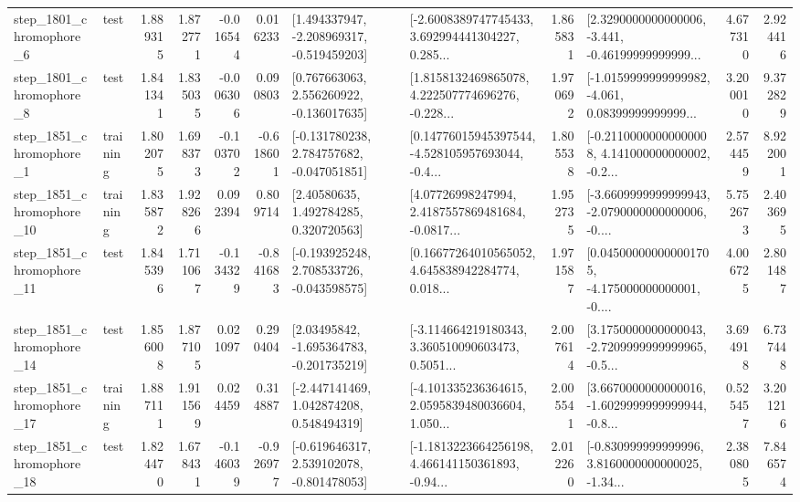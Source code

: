 \begin{tabular}{llrrrrllrlrr}
  step\_1801\_chromophore\_6 &      test &      1.889315 &    1.872771 &     -0.016544 &  0.016233 &   [1.494337947, -2.208969317, -0.519459203] &  [-2.6008389747745433, 3.692994441304227, 0.285... &       1.865831 &  [2.3290000000000006, -3.441, -0.46199999999999... &            4.677310 &          2.924416 \\
  step\_1801\_chromophore\_8 &      test &      1.841341 &    1.835035 &     -0.006306 &  0.090803 &    [0.767663063, 2.556260922, -0.136017635] &  [1.8158132469865078, 4.222507774696276, -0.228... &       1.970692 &  [-1.0159999999999982, -4.061, 0.08399999999999... &            3.200010 &          9.372829 \\
  step\_1851\_chromophore\_1 &  training &      1.802075 &    1.698373 &     -0.103702 & -0.618601 &   [-0.131780238, 2.784757682, -0.047051851] &  [0.14776015945397544, -4.528105957693044, -0.4... &       1.805538 &  [-0.21100000000000008, 4.141000000000002, -0.2... &            2.574459 &          8.922001 \\
 step\_1851\_chromophore\_10 &  training &      1.835872 &    1.928266 &      0.092394 &  0.809714 &      [2.40580635, 1.492784285, 0.320720563] &  [4.07726998247994, 2.4187557869481684, -0.0817... &       1.952735 &  [-3.6609999999999943, -2.0790000000000006, -0.... &            5.752673 &          2.403695 \\
 step\_1851\_chromophore\_11 &      test &      1.845396 &    1.711067 &     -0.134329 & -0.841683 &   [-0.193925248, 2.708533726, -0.043598575] &  [0.16677264010565052, 4.645838942284774, 0.018... &       1.971587 &  [0.045000000000001705, -4.175000000000001, -0.... &            4.006725 &          2.801487 \\
 step\_1851\_chromophore\_14 &      test &      1.856008 &    1.877105 &      0.021097 &  0.290404 &    [2.03495842, -1.695364783, -0.201735219] &  [-3.114664219180343, 3.360510090603473, 0.5051... &       2.007614 &  [3.1750000000000043, -2.7209999999999965, -0.5... &            3.694918 &          6.737448 \\
 step\_1851\_chromophore\_17 &  training &      1.887111 &    1.911569 &      0.024459 &  0.314887 &    [-2.447141469, 1.042874208, 0.548494319] &  [-4.101335236364615, 2.0595839480036604, 1.050... &       2.005541 &  [3.6670000000000016, -1.6029999999999944, -0.8... &            0.525457 &          3.201216 \\
 step\_1851\_chromophore\_18 &      test &      1.824470 &    1.678431 &     -0.146039 & -0.926977 &   [-0.619646317, 2.539102078, -0.801478053] &  [-1.1813223664256198, 4.466141150361893, -0.94... &       2.012260 &  [-0.830999999999996, 3.8160000000000025, -1.34... &            2.380805 &          7.846574 \\

\end{tabular}
